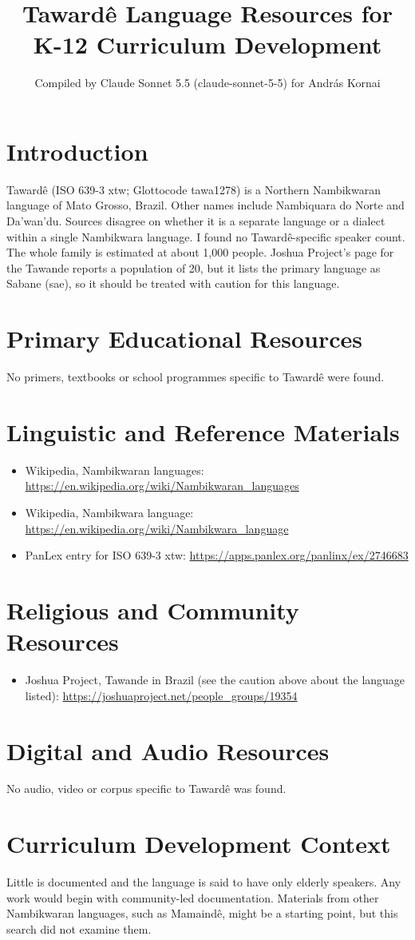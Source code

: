 \documentclass[12pt]{article}
\title{Taward\^e Language Resources for K-12 Curriculum Development}
\author{Compiled by Claude Sonnet 5.5 (claude-sonnet-5-5) for Andr\'as Kornai}
\date{}
\begin{document}
\maketitle

\section{Introduction}
Taward\^e (ISO 639-3 xtw; Glottocode tawa1278) is a Northern Nambikwaran language of Mato Grosso, Brazil. Other names include Nambiquara do Norte and Da'wan'du. Sources disagree on whether it is a separate language or a dialect within a single Nambikwara language. I found no Taward\^e-specific speaker count. The whole family is estimated at about 1,000 people. Joshua Project's page for the Tawande reports a population of 20, but it lists the primary language as Sabane (sae), so it should be treated with caution for this language.

\section{Primary Educational Resources}
No primers, textbooks or school programmes specific to Taward\^e were found.

\section{Linguistic and Reference Materials}
\begin{itemize}
\item Wikipedia, Nambikwaran languages: \url{https://en.wikipedia.org/wiki/Nambikwaran_languages}
\item Wikipedia, Nambikwara language: \url{https://en.wikipedia.org/wiki/Nambikwara_language}
\item PanLex entry for ISO 639-3 xtw: \url{https://apps.panlex.org/panlinx/ex/2746683}
\end{itemize}

\section{Religious and Community Resources}
\begin{itemize}
\item Joshua Project, Tawande in Brazil (see the caution above about the language listed): \url{https://joshuaproject.net/people_groups/19354}
\end{itemize}

\section{Digital and Audio Resources}
No audio, video or corpus specific to Taward\^e was found.

\section{Curriculum Development Context}
Little is documented and the language is said to have only elderly speakers. Any work would begin with community-led documentation. Materials from other Nambikwaran languages, such as Mamaind\^e, might be a starting point, but this search did not examine them.
\end{document}

